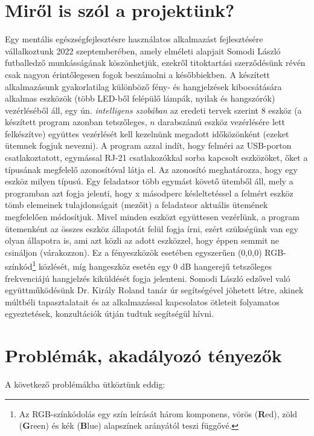 \documentclass[tocnopagenum]{thesis-ekf}
\theoremstyle{definition}
\theoremstyle{remark}
\begin{document}
	\section{Miről is szól a projektünk?}
	Egy mentális egészségfejlesztésre használatos alkalmazást fejlesztésére vállalkoztunk 2022 szeptemberében, amely elméleti alapjait Somodi László futballedző munkásságának köszönhetjük, ezekről titoktartási szerződésünk %
	révén csak nagyon érintőlegesen fogok beszámolni a későbbiekben. A készített alkalmazásunk gyakorlatilag különböző fény- és hangjelzések kibocsátására alkalmas eszközök (több LED-ből felépülő lámpák, nyilak és hangszórók) vezérléséből áll, egy ún. \emph{intelligens szobában} az eredeti tervek szerint 8 eszköz (a készített program azonban tetszőleges, $n$ darabszámú eszköz vezérlésére lett felkészítve) együttes vezérlését kell kezelnünk megadott időközönként (ezeket ütemnek fogjuk nevezni). A program azzal indít, hogy felméri az USB-porton csatlakoztatott, egymással RJ-21 csatlakozókkal sorba kapcsolt eszközöket, őket a típusának megfelelő azonosítóval látja el. Az azonosító meghatározza, hogy egy eszköz milyen típusú. 
	Egy feladatsor több egymást követő ütemből áll, mely a programban azt fogja jelenti, hogy x másodperc késleltetéssel a felmért eszköz tömb elemeinek tulajdonságait (mezőit) a feladatsor aktuális ütemének megfelelően módosítjuk. Mivel minden eszközt együttesen vezérlünk, a program ütemenként az összes eszköz állapotát felül fogja írni, ezért szükségünk van egy olyan állapotra is, ami azt közli az adott eszközzel, hogy éppen semmit ne csináljon (várakozzon). Ez a fényeszközök esetében egyszerűen (0,0,0) RGB-színkód\footnote{Az RGB-színkódolás egy szín leírását három komponens, vörös (\textbf{R}ed), zöld (\textbf{G}reen) és kék (\textbf{B}lue) alapszínek arányától teszi függővé.} közlését, míg hangeszköz esetén egy 0 dB hangerejű tetszőleges frekvenciájú hangjelzés kiküldését fogja jelenteni.
	Somodi László edzővel való együttműködésünk Dr. Király Roland tanár úr segítségével jöhetett létre, akinek múltbéli tapasztalatait és az alkalmazással kapcsolatos ötleteit folyamatos egyeztetések, konzultációk útján tudtuk segítségül hívni.
	\section{Problémák, akadályozó tényezők}
	A következő problémákba ütköztünk eddig:
	
\end{document}
